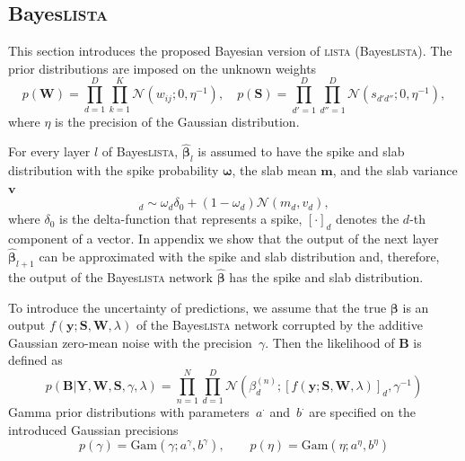 \documentclass{article}
\begin{document}

  \subsection{Bayes\textsc{lista}}
  \label{subsec:bayesian_lista}
  This section introduces the proposed Bayesian version of \textsc{lista} (Bayes\textsc{lista}). The prior distributions are imposed on the unknown weights
  \begin{equation}
  \label{eq:ws}
  p(\mathbf{W}) = \prod_{d=1}^D\prod_{k=1}^K \mathcal{N}(w_{ij} ; 0, \eta^{-1}), \quad
  p(\mathbf{S}) = \prod_{d'=1}^D\prod_{d''=1}^D \mathcal{N}(s_{d'd''} ; 0, \eta^{-1}),
  \end{equation}
  where $\eta$ is the precision of the Gaussian distribution.
  
  For every layer $l$ of Bayes\textsc{lista}, $\widehat{\boldsymbol\beta}_{l}$ is assumed to have the spike and slab distribution with the spike probability $\boldsymbol\omega$, the slab mean $\mathbf{m}$, and the slab variance $\mathbf{v}$
  \begin{equation}
  [\widehat{\boldsymbol\beta}_{l}]_d \sim \omega_d \delta_0 + (1 - \omega_d)\mathcal{N}(m_d, v_d),
  \end{equation}
  where $\delta_0$ is the delta-function that represents a spike, $[\cdot]_d$ denotes the $d$-th component of a vector. In appendix we show that the output of the next layer $\widehat{\boldsymbol\beta}_{l+1}$ can be approximated with the spike and slab distribution and, therefore, the output of the Bayes\textsc{lista} network $\widehat{\boldsymbol\beta}$ has the spike and slab distribution.
  
  To introduce the uncertainty of predictions, we assume that the true $\boldsymbol\beta$ is an output $f(\mathbf{y} ; \mathbf{S}, \mathbf{W}, \lambda)$ of the Bayes\textsc{lista} network corrupted by the additive Gaussian zero-mean noise with the precision~$\gamma$. Then the likelihood of $\mathbf{B}$ is defined as
  \begin{equation}
  \label{eq:likelihood}
  p(\mathbf{B}| \mathbf{Y}, \mathbf{W}, \mathbf{S}, \gamma, \lambda)
  = \prod_{n=1}^N\prod_{d=1}^D\mathcal{N}\left(\beta_d^{(n)}; [f(\mathbf{y} ; \mathbf{S}, \mathbf{W}, \lambda)]_d, \gamma^{-1}\right)
  \end{equation}
  Gamma prior distributions with parameters~$a^{\cdot}$ and~$b^{\cdot}$ are specified on the introduced Gaussian precisions
  \begin{equation}
  \label{eq:gamma_eta}
  p(\gamma) = \text{Gam}\left(\gamma; a^{\gamma}, b^{\gamma}\right), \qquad
  p(\eta) = \text{Gam}\left(\eta; 	a^{\eta}, b^{\eta}\right)
  \end{equation}
  
\end{document}
